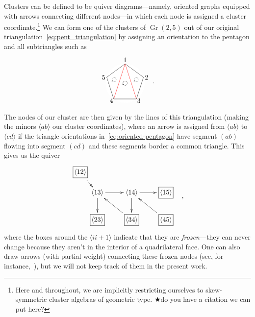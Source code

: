 \documentclass[12pt]{article}
\DeclareMathOperator{\Gr}{Gr}
\def\ket#1{\langle #1 \rangle}
\def\flag{{\color{red} $\bigstar$}}
\def\drawLabeledPentagon{
\coordinate (P1) at (90:1);
\coordinate (P2) at (18:1);
\coordinate (P3) at (306:1);
\coordinate (P4) at (234:1);
\coordinate (P5) at (162:1);
\draw[white,fill=white] (0,0) circle (1cm);
\draw (P1) -- (P2) -- (P3) -- (P4) -- (P5) -- cycle;
\draw (0,1.2) node {1};
\draw (.9,.3) node[anchor=west] {2};
\draw (.5,-.9) node[anchor=west] {3};
\draw (-.5,-.9) node[anchor=east] {4};
\draw (-.9,.3) node[anchor=east] {5};
}
\begin{document}
Clusters can be defined to be quiver diagrams---namely, oriented graphs equipped with arrows connecting different nodes---in which each node is assigned a cluster coordinate.\footnote{Here and throughout, we are implicitly restricting ourselves to skew-symmetric cluster algebras of geometric type.\flag{do you have a citation we can put here?}} We can form one of the clusters of $\Gr(2,5)$ out of our original triangulation~\eqref{eq:pent_triangulation} by assigning an orientation to the pentagon and all subtriangles such as
\begin{equation}\label{eq:oriented-pentagon}
\begin{gathered}
\begin{tikzpicture}
  \drawLabeledPentagon
  \draw[color=red] (P1) -- (P3);
  \draw[color=red] (P1) -- (P4);
  \draw (18:.6) node[rotate=144] {$\circlearrowleft$};
  \draw (0:0) node[rotate=144] {$\circlearrowleft$};
  \draw (162:.6) node[rotate=144] {$\circlearrowleft$};
\end{tikzpicture} 
\end{gathered} \ .
\end{equation}
The nodes of our cluster are then given by the lines of this triangulation (making the minors $\ket{ab}$ our cluster coordinates), where an arrow is assigned from $\ket{ab}$ to $\ket{cd}$ if the triangle orientations in~\eqref{eq:oriented-pentagon} have segment $(ab)$ flowing into segment $(cd)$ and these segments border a common triangle. This gives us the quiver
\begin{equation}\label{eq:gr25-seed}
\begin{gathered}
\begin{xy} 0;<1pt,0pt>:<0pt,-1pt>::
	(25,30) *+{\langle 13\rangle} ="0",
	(75,30) *+{\langle 14\rangle} ="1",
	(125,30) *+{\framebox[5ex]{$\langle 15\rangle$}} ="2",
	(125,70) *+{\framebox[5ex]{$\langle 45\rangle$}} ="3",
	(75,70) *+{\framebox[5ex]{$\langle 34\rangle$}} ="4",
	(25,70) *+{\framebox[5ex]{$\langle 23\rangle$}} ="5",
	(0,0) *+{\framebox[5ex]{$\langle 12\rangle$}} ="6",
	(145,75) *+{},
	"0", {\ar"1"},
	"4", {\ar"0"},
	"0", {\ar"5"},
	"6", {\ar"0"},
	"1", {\ar"2"},
	"3", {\ar"1"},
	"1", {\ar"4"},
\end{xy}
\end{gathered} ,
\end{equation}
where the boxes around the $\ket{ii+1}$ indicate that they are \emph{frozen}---they can never change because they aren't in the interior of a quadrilateral face. One can also draw arrows (with partial weight) connecting these frozen nodes (see, for instance,~\cite{ArkaniHamed:2012nw}), but we will not keep track of them in the present work. 
\end{document}
